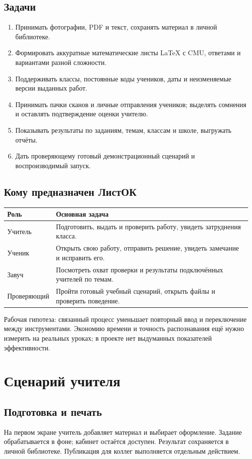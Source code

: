 \documentclass[a4paper,11pt]{article}
\newcommand{\note}[1]{\par\smallskip\colorbox{soft}{\parbox{\dimexpr\linewidth-2\fboxsep}{\small #1}}\par\smallskip}
\begin{document}
\subsection{Задачи}
\begin{enumerate}
\item Принимать фотографии, PDF и текст, сохранять материал в личной библиотеке.
\item Формировать аккуратные математические листы LaTeX с CMU, ответами
и вариантами разной сложности.
\item Поддерживать классы, постоянные коды учеников, даты и неизменяемые
версии выданных работ.
\item Принимать пачки сканов и личные отправления учеников; выделять сомнения
и оставлять подтверждение оценки учителю.
\item Показывать результаты по заданиям, темам, классам и школе, выгружать отчёты.
\item Дать проверяющему готовый демонстрационный сценарий и воспроизводимый запуск.
\end{enumerate}

\subsection{Кому предназначен ЛистОК}
\begin{tabularx}{\linewidth}{@{}p{25mm}X@{}}
\toprule
\textbf{Роль}&\textbf{Основная задача}\\\midrule
Учитель&Подготовить, выдать и проверить работу, увидеть затруднения класса.\\
Ученик&Открыть свою работу, отправить решение, увидеть замечание и исправить его.\\
Завуч&Посмотреть охват проверки и результаты подключённых учителей по темам.\\
Проверяющий&Пройти готовый учебный сценарий, открыть файлы и проверить поведение.\\
\bottomrule
\end{tabularx}

\note{Рабочая гипотеза: связанный процесс уменьшает повторный ввод и переключение
между инструментами. Экономию времени и точность распознавания ещё нужно измерить
на реальных уроках; в проекте нет выдуманных показателей эффективности.}
\newpage
\section{Сценарий учителя}
\subsection{Подготовка и печать}
На первом экране учитель добавляет материал и выбирает оформление. Задание
обрабатывается в фоне; кабинет остаётся доступен. Результат сохраняется в личной
библиотеке. Публикация для коллег выполняется отдельным действием.
\end{document}
